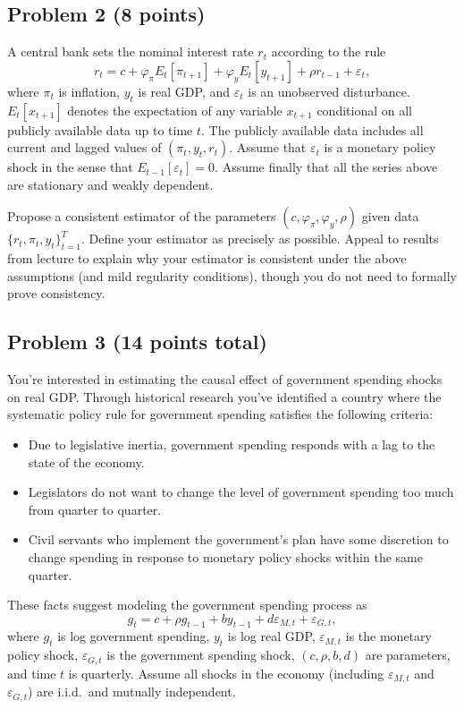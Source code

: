 \documentclass[12pt]{article}
\begin{document}
\subsection*{Problem 2 (8 points)}
A central bank sets the nominal interest rate $r_t$ according to the rule
\[r_t = c + \varphi_\pi E_t[\pi_{t+1}] + \varphi_y E_t[y_{t+1}] + \rho r_{t-1} + \varepsilon_t,\]
where $\pi_t$ is inflation, $y_t$ is real GDP, and $\varepsilon_t$ is an unobserved disturbance. $E_t[x_{t+1}]$ denotes the expectation of any variable $x_{t+1}$ conditional on all publicly available data up to time $t$. The publicly available data includes all current and lagged values of $(\pi_t,y_t,r_t)$. Assume that $\varepsilon_t$ is a monetary policy shock in the sense that $E_{t-1}[\varepsilon_t]=0$. Assume finally that all the series above are stationary and weakly dependent.

Propose a consistent estimator of the parameters $(c,\varphi_\pi,\varphi_y,\rho)$ given data $\lbrace r_t,\pi_t,y_t \rbrace_{t=1}^T$. Define your estimator as precisely as possible. Appeal to results from lecture to explain why your estimator is consistent under the above assumptions (and mild regularity conditions), though you do not need to formally prove consistency.

\subsection*{Problem 3 (14 points total)}
You're interested in estimating the causal effect of government spending shocks on real GDP. Through historical research you've identified a country where the systematic policy rule for government spending satisfies the following criteria:
\begin{itemize}
\item Due to legislative inertia, government spending responds with a lag to the state of the economy.
\item Legislators do not want to change the level of government spending too much from quarter to quarter.
\item Civil servants who implement the government's plan have some discretion to change spending in response to monetary policy shocks within the same quarter.
\end{itemize}
These facts suggest modeling the government spending process as
\[g_t = c + \rho g_{t-1} + b y_{t-1} + d \varepsilon_{M,t} + \varepsilon_{G,t},\]
where $g_t$ is log government spending, $y_t$ is log real GDP, $\varepsilon_{M,t}$ is the monetary policy shock, $\varepsilon_{G,t}$ is the government spending shock, $(c,\rho,b,d)$ are parameters, and time $t$ is quarterly. Assume all shocks in the economy (including $\varepsilon_{M,t}$ and $\varepsilon_{G,t}$) are i.i.d.\ and mutually independent.
\end{document}
